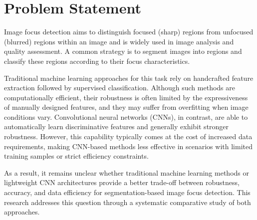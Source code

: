 \section{Problem Statement}
Image focus detection aims to distinguish focused (sharp) regions from
unfocused (blurred) regions within an image and is widely used in image
analysis and quality assessment. A common strategy is to segment images into
regions and classify these regions according to their focus characteristics.

Traditional machine learning approaches for this task rely on handcrafted
feature extraction followed by supervised classification. Although such methods
are computationally efficient, their robustness is often limited by the
expressiveness of manually designed features, and they may suffer from
overfitting when image conditions vary. Convolutional neural networks (CNNs),
in contrast, are able to automatically learn discriminative features and
generally exhibit stronger robustness. However, this capability typically comes
at the cost of increased data requirements, making CNN-based methods less
effective in scenarios with limited training samples or strict efficiency
constraints.

As a result, it remains unclear whether traditional machine learning methods or
lightweight CNN architectures provide a better trade-off between robustness,
accuracy, and data efficiency for segmentation-based image focus detection.
This research addresses this question through a systematic comparative study of
both approaches.